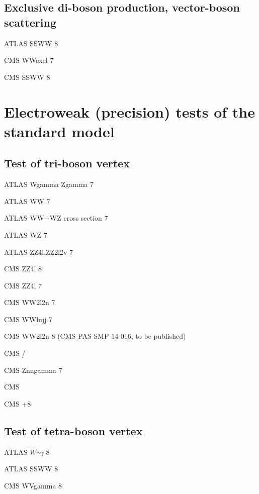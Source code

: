 \documentclass[12pt]{iopart}
\begin{document}
\subsection{Exclusive di-boson production, vector-boson scattering}

ATLAS SSWW 8 \TeV~\cite{Aad:2014zda}

CMS WWexcl 7 \TeV~\cite{Chatrchyan:2013foa}

CMS SSWW 8 \TeV~\cite{Khachatryan:2014sta}

\section{Electroweak (precision) tests of the standard model}
\subsection{Test of tri-boson vertex}

ATLAS Wgamma Zgamma 7 \TeV~\cite{Aad:2013izg}

ATLAS WW 7 \TeV~\cite{ATLAS:2012mec}

ATLAS WW+WZ cross section 7 \TeV~\cite{Aad:2014mda}

ATLAS WZ 7 \TeV~\cite{Aad:2012twa}

ATLAS ZZ4l,ZZ2l2v 7 \TeV~\cite{Aad:2012awa}

CMS ZZ4l 8 \TeV~\cite{Khachatryan:2014dia}

CMS ZZ4l 7 \TeV~\cite{Chatrchyan:2012sga}

CMS WW2l2n 7 \TeV~\cite{Chatrchyan:2013yaa}

CMS WWlnjj 7 \TeV~\cite{Chatrchyan:2012bd}

CMS WW2l2n 8 \TeV (CMS-PAS-SMP-14-016, to be published)

CMS \Wg/ \TeV~\cite{Chatrchyan:2013fya}

CMS Znngamma 7 \TeV~\cite{Chatrchyan:2013nda}

CMS  \TeV~\cite{Khachatryan:2015kea}

CMS +8 \TeV~\cite{Khachatryan:2015pba}

\subsection{Test of tetra-boson vertex}

ATLAS $W\gamma\gamma$ 8 \TeV~\cite{Aad:2015uqa}

ATLAS SSWW 8 \TeV~\cite{Aad:2014zda}

CMS WVgamma 8 \TeV~\cite{Chatrchyan:2014bza}
\end{document}
